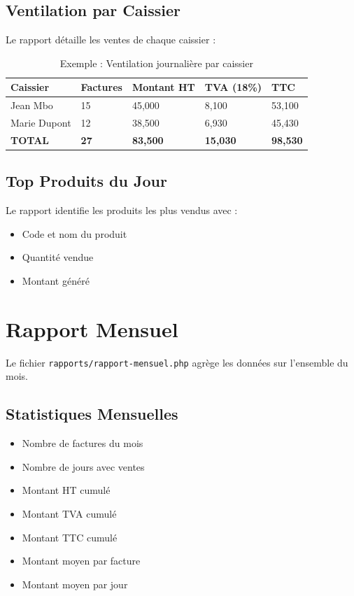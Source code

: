 \documentclass[12pt,a4paper]{report}
\begin{document}
\subsection{Ventilation par Caissier}

Le rapport détaille les ventes de chaque caissier :

\begin{table}[h]
\centering
\begin{tabularx}{\textwidth}{|l|X|X|X|X|}
\hline
\textbf{Caissier} & \textbf{Factures} & \textbf{Montant HT} & \textbf{TVA (18\%)} & \textbf{TTC} \\
\hline
Jean Mbo & 15 & 45,000 & 8,100 & 53,100 \\
Marie Dupont & 12 & 38,500 & 6,930 & 45,430 \\
\textbf{TOTAL} & \textbf{27} & \textbf{83,500} & \textbf{15,030} & \textbf{98,530} \\
\hline
\end{tabularx}
\caption{Exemple : Ventilation journalière par caissier}
\end{table}

\subsection{Top Produits du Jour}

Le rapport identifie les produits les plus vendus avec :
\begin{itemize}
    \item Code et nom du produit
    \item Quantité vendue
    \item Montant généré
\end{itemize}

\section{Rapport Mensuel}

Le fichier \texttt{rapports/rapport-mensuel.php} agrège les données sur l'ensemble du mois.

\subsection{Statistiques Mensuelles}

\begin{itemize}
    \item Nombre de factures du mois
    \item Nombre de jours avec ventes
    \item Montant HT cumulé
    \item Montant TVA cumulé
    \item Montant TTC cumulé
    \item Montant moyen par facture
    \item Montant moyen par jour
\end{itemize}
\end{document}
